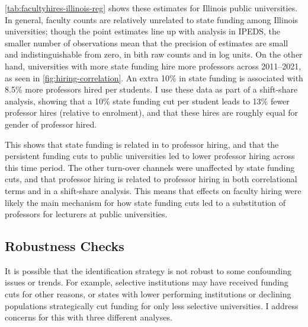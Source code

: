 \autoref{tab:facultyhires-illinois-reg} shows these estimates for Illinois public universities.
In general, faculty counts are relatively unrelated to state funding among Illinois universities; though the point estimates line up with analysis in IPEDS, the smaller number of observations mean that the precision of estimates are small and indistinguishable from zero, in bith raw counts and in log units.
On the other hand, universities with more state funding hire more professors across 2011--2021, as seen in \autoref{fig:hiring-correlation}.
An extra 10\% in state funding is associated with 8.5\% more professors hired per students.
I use these data as part of a shift-share analysis, showing that a 10\% state funding cut per student leads to 13\% fewer professor hires (relative to enrolment), and that these hires are roughly equal for gender of professor hired.

This shows that state funding is related in to professor hiring, and that the persistent funding cuts to public universities led to lower professor hiring across this time period.
The other turn-over channels were unaffected by state funding cuts, and that professor hiring is related to professor hiring in both correlational terms and in a shift-share analysis.
This means that effects on faculty hiring were likely the main mechanism for how state funding cuts led to a substitution of professors for lecturers at public universities.

\subsection{Robustness Checks}
\label{sec:results-robustness}
It is possible that the identification strategy is not robust to some confounding issues or trends.
For example, selective institutions may have received funding cuts for other reasons, or states with lower performing institutions or declining populations strategically cut funding for only less selective universities.
I address concerns for this with three different analyses.

